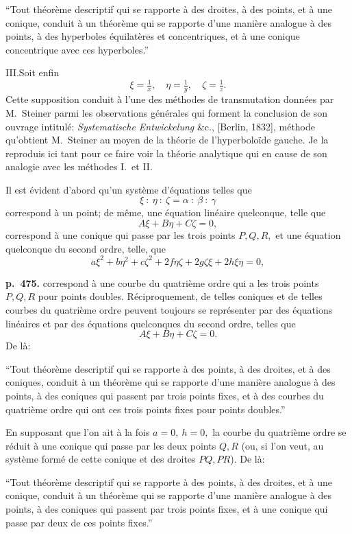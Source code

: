 \documentclass[11pt]{article}
\begin{document}
``Tout th\'eor\`eme descriptif qui se rapporte \`a des droites, \`a des points, et \`a une conique, conduit \`a un th\'eor\`eme qui se rapporte d'une mani\`ere analogue \`a des points, \`a des hyperboles \'equilat\`eres et concentriques, et \`a une conique concentrique avec ces hyperboles.''

III.\quad Soit enfin
\[ \xi = \tfrac{1}{x},\quad \eta = \tfrac{1}{y},\quad \zeta = \tfrac{1}{z}. \]
Cette supposition conduit \`a l'une des m\'ethodes de transmutation donn\'ees par M.~Steiner parmi les observations g\'en\'erales qui forment la conclusion de son ouvrage intitul\'e: \textit{Systematische Entwickelung} \&c., [Berlin, 1832], m\'ethode qu'obtient M.~Steiner au moyen de la th\'eorie de l'hyperbolo\"ide gauche. Je la reproduis ici tant pour ce faire voir la th\'eorie analytique qui en cause de son analogie avec les m\'ethodes I.\ et II.

Il est \'evident d'abord qu'un syst\`eme d'\'equations telles que
\[ \xi\ :\ \eta\ :\ \zeta = \alpha\ :\ \beta\ :\ \gamma \]
correspond \`a un point; de m\^eme, une \'equation lin\'eaire quelconque, telle que
\[ A\xi + B\eta + C\zeta = 0, \]
correspond \`a une conique qui passe par les trois points $P, Q, R,$ et une \'equation quelconque du second ordre, telle, que
\[ a\xi^2 + b\eta^2 + c\zeta^2 + 2f\eta\zeta + 2g\zeta\xi + 2h\xi\eta = 0, \]

\bigskip
\noindent\textbf{p.~475.} correspond \`a une courbe du quatri\`eme ordre qui a les trois points $P, Q, R$ pour points doubles. R\'eciproquement, de telles coniques et de telles courbes du quatri\`eme ordre peuvent toujours se repr\'esenter par des \'equations lin\'eaires et par des \'equations quelconques du second ordre, telles que
\[ A\xi + B\eta + C\zeta = 0. \]
De l\`a:

``Tout th\'eor\`eme descriptif qui se rapporte \`a des points, \`a des droites, et \`a des coniques, conduit \`a un th\'eor\`eme qui se rapporte d'une mani\`ere analogue \`a des points, \`a des coniques qui passent par trois points fixes, et \`a des courbes du quatri\`eme ordre qui ont ces trois points fixes pour points doubles.''

En supposant que l'on ait \`a la fois $a = 0,\ h = 0,$ la courbe du quatri\`eme ordre se r\'eduit \`a une conique qui passe par les deux points $Q, R$ (ou, si l'on veut, au syst\`eme form\'e de cette conique et des droites $PQ, PR$). De l\`a:

``Tout th\'eor\`eme descriptif qui se rapporte \`a des points, \`a des droites, et \`a une conique, conduit \`a un th\'eor\`eme qui se rapporte d'une mani\`ere analogue \`a des points, \`a des coniques qui passent par trois points fixes, et \`a une conique qui passe par deux de ces points fixes.''
\end{document}
